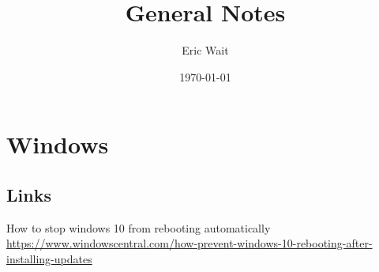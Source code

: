 \documentclass[11pt]{article}
\author{Eric Wait}
\title{General Notes}
\date{\today}
\begin{document}
	\maketitle
	\newpage

	\listoftodos
	\newpage

	\section{Windows}
		\subsection*{Links}
			How to stop windows 10 from rebooting automatically \href{https://www.windowscentral.com/how-prevent-windows-10-rebooting-after-installing-updates}{https://www.windowscentral.com/how-prevent-windows-10-rebooting-after-installing-updates}

	\newpage
	
\end{document}
